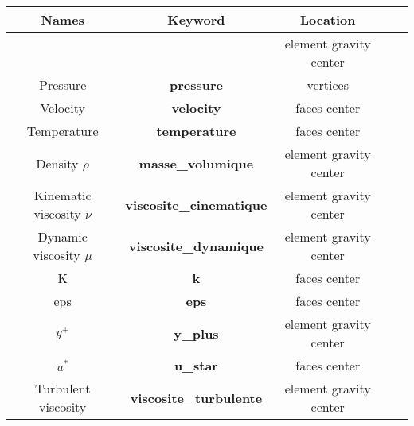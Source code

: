 \begin{longtable}[h!]{|c|c|c|c|c|}
\hline 
\textbf{Names}              & \textbf{Keyword}                  & \textbf{Location}     \\ \hline
\hline
                            &                                   & element gravity center    \\
Pressure                    & \textbf{pressure}                 & vertices                  \\ \hline
Velocity                    & \textbf{velocity}                 & faces center              \\ \hline
Temperature                 & \textbf{temperature}              & faces center              \\ \hline
\hline
Density $\rho$              & \textbf{masse\_volumique}         & element gravity center    \\ \hline
Kinematic viscosity $\nu$   & \textbf{viscosite\_cinematique}   & element gravity center    \\ \hline
Dynamic viscosity $\mu$     & \textbf{viscosite\_dynamique}     & element gravity center    \\ \hline
\hline
K                           & \textbf{k}                        & faces center              \\ \hline
eps                         & \textbf{eps}                      & faces center              \\ \hline
$y^+$                       & \textbf{y\_plus}                  & element gravity center    \\ \hline
$u^*$                       & \textbf{u\_star}                  & faces center              \\ \hline
Turbulent viscosity         & \textbf{viscosite\_turbulente}    & element gravity center    \\ \hline
\end{longtable}


